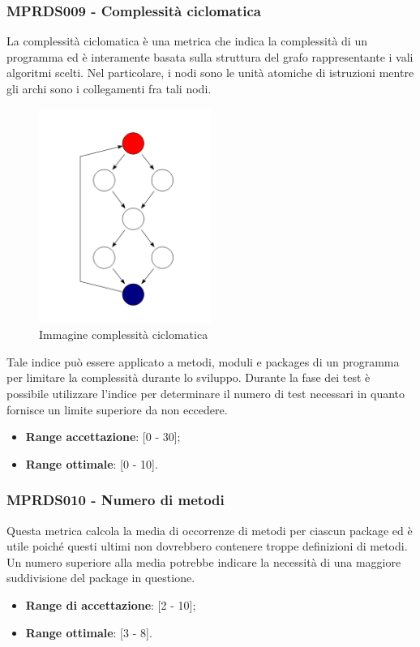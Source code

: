 {\subsubsection{MPRDS009 - Complessità ciclomatica}
La complessità ciclomatica è una metrica che indica la complessità di un programma ed è interamente basata sulla struttura del grafo rappresentante i vali algoritmi scelti. Nel particolare, i nodi sono le unità atomiche di istruzioni mentre gli archi sono i collegamenti fra tali nodi.
\begin{figure}[H]
    \begin{center}
    \includegraphics[width=0.5\textwidth]{../includes/pics/ciclomatica.png}
    \caption{Immagine complessità ciclomatica}
    \end{center}
\end{figure}
Tale indice può essere applicato a metodi, moduli e packages di un programma per limitare la complessità durante lo sviluppo. Durante la fase dei test è possibile utilizzare l'indice per determinare il numero di test necessari in quanto fornisce un limite superiore da non eccedere.
\begin{itemize}
    \item \textbf{Range accettazione}: [0 - 30];
    \item \textbf{Range ottimale}: [0 - 10].
\end{itemize}
\subsubsection{MPRDS010 - Numero di metodi}
Questa metrica calcola la media di occorrenze di metodi per ciascun package ed è utile poiché questi ultimi non dovrebbero contenere troppe definizioni di metodi. Un numero superiore alla media potrebbe indicare la necessità di una maggiore suddivisione del package in questione.
\begin{itemize}
    \item \textbf{Range di accettazione}: [2 - 10];
    \item \textbf{Range ottimale}: [3 - 8].
\end{itemize}
}
